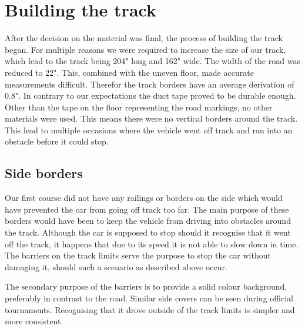 \section{Building the track}
After the decision on the material was final,  the process of building the track began. For multiple reasons we were required to increase the size of our track, which lead to the track being 204" long and 162" wide. The width of the road was reduced to 22". This, combined with the uneven floor, made accurate measurements difficult. Therefor the track borders have an average derivation of 0.8". In contrary to our expectations the duct tape proved to be durable enough. Other than the tape on the floor representing the road markings, no other materials were used. This means there were no vertical borders around the track. This lead to multiple occasions where the vehicle went off track and ran into an obstacle before it could stop.

\subsection{Side borders}
Our first course did not have any railings or borders on the side which would have prevented the car from going off track too far. The main purpose of these borders would have been to keep the vehicle from driving into obstacles around the track. Although the car is supposed to stop should it recognise that it went off the track, it happens that due to its speed it is not able to slow down in time. The barriers on the track limits serve the purpose to stop the car without damaging it, should such a scenario as described above occur.

The secondary purpose of the barriers is to provide a solid colour background, preferably in contrast to the road. Similar side covers can be seen during official tournaments. Recognising that it drove outside of the track limits is simpler and more consistent.